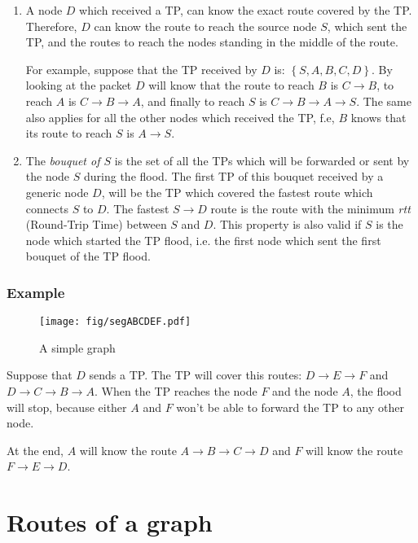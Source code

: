 \documentclass[a4paper]{article}
\begin{document}
\begin{enumerate}
	\item A node $D$ which received a TP, can know the exact route covered
		by the TP. Therefore, $D$ can know the route to reach the
		source node $S$, which sent the TP, and the routes to reach
		the nodes standing in the middle of the route.
		
		For example, suppose that the TP received by $D$ is: $\left\{
		S, A, B, C, D \right\}$. By looking at the packet $D$ will
		know that the route to reach $B$ is $C\rightarrow B$, to reach $A$ is
		$C\rightarrow B\rightarrow A$, and finally to reach $S$ is
		$C\rightarrow B\rightarrow A\rightarrow S$.
		The same also applies for all the other nodes which received
		the TP, f.e, $B$ knows that its route to reach $S$ is
		$A\rightarrow S$.
	\item The \emph{bouquet of $S$} is the set of all the TPs which will
		be forwarded or sent by the node $S$ during the flood.
		The first TP of this bouquet received by a generic node $D$,
		will be the TP which covered the fastest route which connects
		$S$ to $D$.
		The fastest $S \rightarrow D$ route is the route with the
		minimum \emph{rtt} (Round-Trip Time) between $S$ and $D$.
		This property is also valid if $S$ is the node which started
		the TP flood, i.e. the first node which sent the first bouquet
		of the TP flood.
\end{enumerate}


\subsubsection*{Example}
\begin{figure}[h]
	\begin{center}
		\texttt{[image: fig/segABCDEF.pdf]}
	\end{center}
	\caption{A simple graph}
\end{figure}

Suppose that $D$ sends a TP. The TP will cover this routes:
$D \rightarrow E \rightarrow F$ and $D \rightarrow C \rightarrow B \rightarrow A$.
When the TP reaches the node $F$ and the node $A$, the flood will stop,
because either $A$ and $F$ won't be able to forward the TP to any other node.

At the end, $A$ will know the route $A \rightarrow B \rightarrow C \rightarrow D$ and $F$ will know the
route $F \rightarrow E \rightarrow D$.

\section{Routes of a graph}
\label{sec:gen_routes}
\end{document}
